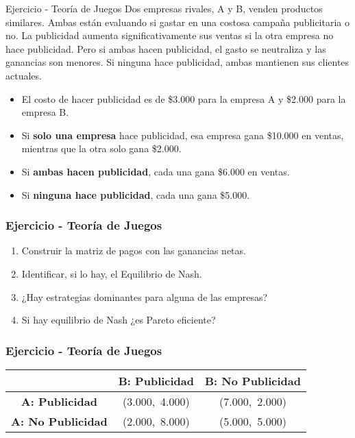 \documentclass{beamer}
\begin{document}
\begin{frame}{Ejercicio - Teoría de Juegos}
Dos empresas rivales, A y B, venden productos similares. Ambas están evaluando si gastar en una costosa campaña publicitaria o no. La publicidad aumenta significativamente sus ventas si la otra empresa no hace publicidad. Pero si ambas hacen publicidad, el gasto se neutraliza y las ganancias son menores. Si ninguna hace publicidad, ambas mantienen sus clientes actuales.
    \begin{itemize}
        \item El costo de hacer publicidad es de \$3.000 para la empresa A y \$2.000 para la empresa B.
        \item Si \textbf{solo una empresa} hace publicidad, esa empresa gana \$10.000 en ventas, mientras que la otra solo gana \$2.000.
        \item Si \textbf{ambas hacen publicidad}, cada una gana \$6.000 en ventas.
        \item Si \textbf{ninguna hace publicidad}, cada una gana \$5.000.
    \end{itemize}
\end{frame}

\begin{frame}
\frametitle{Ejercicio - Teoría de Juegos}
\begin{enumerate}
    \item Construir la matriz de pagos con las ganancias netas.
    \item Identificar, si lo hay, el Equilibrio de Nash.
    \item ¿Hay estrategias dominantes para alguna de las empresas?
    \item Si hay equilibrio de Nash ¿es Pareto eficiente?
\end{enumerate}
\end{frame}

\begin{frame}
\frametitle{Ejercicio - Teoría de Juegos}
\begin{center}
\renewcommand{\arraystretch}{1.8} %
\begin{tabular}{c|c|c}
 & \textbf{B: Publicidad} & \textbf{B: No Publicidad} \\
\hline
\textbf{A: Publicidad} & (3.000,\ 4.000) & (7.000,\ 2.000) \\
\textbf{A: No Publicidad} & (2.000,\ 8.000) & (5.000,\ 5.000) \\
\end{tabular}
\end{center}

\end{frame}
\end{document}
